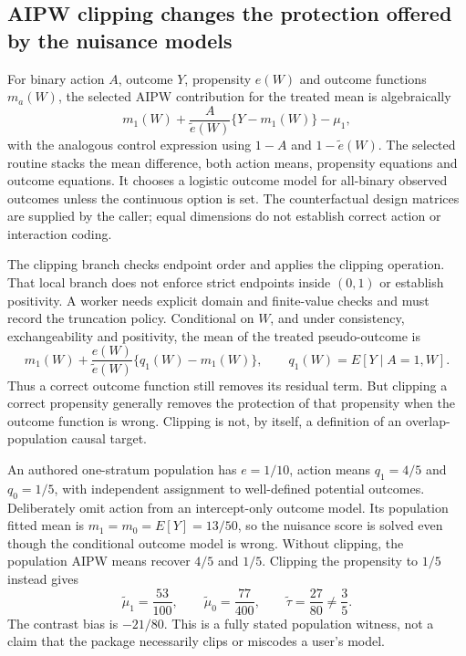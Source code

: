 \subsection{AIPW clipping changes the protection offered by the nuisance models}
For binary action $A$, outcome $Y$, propensity $e(W)$ and outcome
functions $m_a(W)$, the selected AIPW contribution for the treated mean
is algebraically
\[
 m_1(W)+\frac{A}{\widetilde e(W)}\{Y-m_1(W)\}-\mu_1,
\]
with the analogous control expression using $1-A$ and
$1-\widetilde e(W)$. The selected routine stacks the mean difference,
both action means, propensity equations and outcome equations. It chooses
a logistic outcome model for all-binary observed outcomes unless the
continuous option is set. The counterfactual design matrices are supplied
by the caller; equal dimensions do not establish correct action or
interaction coding.~\citep{exec24_delicatessen_source}

The clipping branch checks endpoint order and applies the clipping
operation. That local branch does not enforce strict endpoints inside
$(0,1)$ or establish positivity. A worker needs explicit domain and
finite-value checks and must record the truncation policy. Conditional
on $W$, and under consistency, exchangeability and positivity, the mean
of the treated pseudo-outcome is
\[
 m_1(W)+\frac{e(W)}{\widetilde e(W)}
       \{q_1(W)-m_1(W)\},
 \qquad q_1(W)=E[Y\mid A=1,W].
\]
Thus a correct outcome function still removes its residual term. But
clipping a correct propensity generally removes the protection of that
propensity when the outcome function is wrong. Clipping is not, by itself,
a definition of an overlap-population causal target.
\citep{exec24_delicatessen_source,exec24_delicatessen_choice}

An authored one-stratum population has $e=1/10$, action means
$q_1=4/5$ and $q_0=1/5$, with independent assignment to well-defined
potential outcomes. Deliberately omit action from an intercept-only
outcome model. Its population fitted mean is
$m_1=m_0=E[Y]=13/50$, so the nuisance score is solved even though the
conditional outcome model is wrong. Without clipping, the population
AIPW means recover $4/5$ and $1/5$. Clipping the propensity to $1/5$
instead gives
\[
 \widetilde\mu_1=\frac{53}{100},\qquad
 \widetilde\mu_0=\frac{77}{400},\qquad
 \widetilde\tau=\frac{27}{80}\ne\frac35.
\]
The contrast bias is $-21/80$. This is a fully stated population witness,
not a claim that the package necessarily clips or miscodes a user's model.
\citep{exec24_delicatessen_choice}


